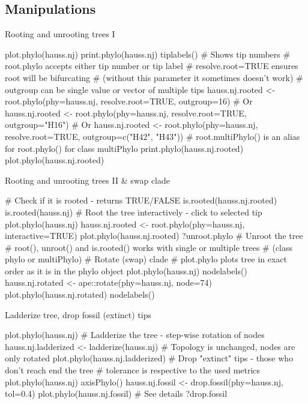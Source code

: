 \documentclass[compress, ucs, xelatex, 11pt, xcolor=svgnames, aspectratio=169,
	hyperref={
		bookmarks=true,
		unicode=true,
		colorlinks=true,
		pdftitle={Molecular data in R},
		plainpages=false,
		pdfauthor={Vojtech Zeisek},
		pdfsubject={Course about phylogeny and evolution in R},
		pdfcreator={XeLaTeX},
		pdfkeywords={R, evolution, phylogeny, molecular data},
		linkcolor=Crimson, %
		anchorcolor=Magenta, %
		citecolor=Magenta, %
		filecolor=Magenta, %
		menucolor=Magenta, %
		urlcolor=DodgerBlue, %
		pdftex},
	url={hyphens, lowtilde} %
	]{beamer}
\begin{document}
\subsection{Manipulations}

\begin{frame}[fragile]{Rooting and unrooting trees I}
	\begin{spluscode}
    plot.phylo(hauss.nj)
    print.phylo(hauss.nj)
    tiplabels() # Shows tip numbers
    # root.phylo accepts either tip number or tip label
    # resolve.root=TRUE ensures root will be bifurcating
    # (without this parameter it sometimes doesn't work)
    # outgroup can be single value or vector of multiple tips
    hauss.nj.rooted <- root.phylo(phy=hauss.nj, resolve.root=TRUE,
      outgroup=16) # Or
    hauss.nj.rooted <- root.phylo(phy=hauss.nj, resolve.root=TRUE,
      outgroup="H16") # Or
    hauss.nj.rooted <- root.phylo(phy=hauss.nj, resolve.root=TRUE,
      outgroup=c("H42", "H43"))
    # root.multiPhylo() is an alias for root.phylo() for class multiPhylo
    print.phylo(hauss.nj.rooted)
    plot.phylo(hauss.nj.rooted)
	\end{spluscode}
\end{frame}

\begin{frame}[fragile]{Rooting and unrooting trees II \& swap clade}
	\begin{spluscode}
    # Check if it is rooted - returns TRUE/FALSE
    is.rooted(hauss.nj.rooted)
    is.rooted(hauss.nj)
    # Root the tree interactively - click to selected tip
    plot.phylo(hauss.nj)
    hauss.nj.rooted <- root.phylo(phy=hauss.nj, interactive=TRUE)
    plot.phylo(hauss.nj.rooted)
    ?unroot.phylo # Unroot the tree
    # root(), unroot() and is.rooted() works with single or multiple trees
    # (class phylo or multiPhylo)
    # Rotate (swap) clade
    # plot.phylo plots tree in exact order as it is in the phylo object
    plot.phylo(hauss.nj)
    nodelabels()
    hauss.nj.rotated <- ape::rotate(phy=hauss.nj, node=74)
    plot.phylo(hauss.nj.rotated)
    nodelabels()
	\end{spluscode}
\end{frame}

\begin{frame}[fragile]{Ladderize tree, drop fossil (extinct) tips}
	\begin{spluscode}
    plot.phylo(hauss.nj)
    # Ladderize the tree - step-wise rotation of nodes
    hauss.nj.ladderized <- ladderize(hauss.nj)
    # Topology is unchanged, nodes are only rotated
    plot.phylo(hauss.nj.ladderized)
    # Drop "extinct" tips - those who don't reach end the tree
    # tolerance is respective to the used metrics
    plot.phylo(hauss.nj)
    axisPhylo()
    hauss.nj.fossil <- drop.fossil(phy=hauss.nj, tol=0.4)
    plot.phylo(hauss.nj.fossil)
    # See details
    ?drop.fossil
	\end{spluscode}
\end{frame}
\end{document}
